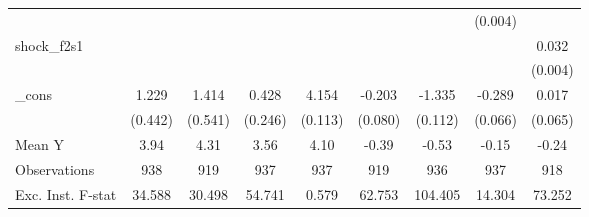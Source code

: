 {\begin{tabular}{l*{8}{c}}
            &                     &                     &                     &                     &                     &                     &     (0.004)         &                     \\
\addlinespace
shock\_f2s1  &                     &                     &                     &                     &                     &                     &                     &       0.032\sym{***}\\
            &                     &                     &                     &                     &                     &                     &                     &     (0.004)         \\
\addlinespace
\_cons      &       1.229\sym{***}&       1.414\sym{**} &       0.428\sym{*}  &       4.154\sym{***}&      -0.203\sym{**} &      -1.335\sym{***}&      -0.289\sym{***}&       0.017         \\
            &     (0.442)         &     (0.541)         &     (0.246)         &     (0.113)         &     (0.080)         &     (0.112)         &     (0.066)         &     (0.065)         \\
\midrule
Mean Y      &        3.94         &        4.31         &        3.56         &        4.10         &       -0.39         &       -0.53         &       -0.15         &       -0.24         \\
Observations&         938         &         919         &         937         &         937         &         919         &         936         &         937         &         918         \\
Exc. Inst. F-stat&      34.588         &      30.498         &      54.741         &       0.579         &      62.753         &     104.405         &      14.304         &      73.252         \\
\bottomrule
\end{tabular}
}
